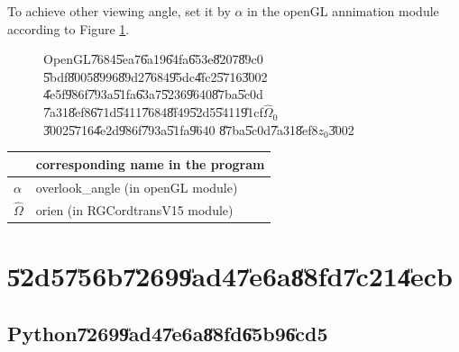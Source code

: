 To achieve other viewing angle, set it by $\alpha $ in the openGL annimation
module according to Figure \ref{gl_alpha}.

\begin{figure}[th]
\caption{OpenGL\U{7684}\U{5ea7}\U{6a19}\U{64fa}\U{653e}\U{8207}\U{89c0}%
\U{5bdf}\U{8005}\U{8996}\U{89d2}\U{7684}\U{95dc}\U{4fc2}\U{5716}\U{3002}%
\U{4e5f}\U{986f}\U{793a}\U{51fa}\U{63a7}\U{5236}\U{9640}\U{87ba}\U{5c0d}%
\U{7a31}\U{8ef8}\U{671d}\U{5411}\U{7684}\U{8f49}\U{52d5}\U{5411}\U{91cf}$%
\hat{\Omega}_{0}$\U{3002}\U{5716}\U{4e2d}\U{986f}\U{793a}\U{51fa}\U{9640}%
\U{87ba}\U{5c0d}\U{7a31}\U{8ef8}$z_{0}$\U{3002}}
\label{gl_alpha}
\begin{center}

\end{center}
\end{figure}

\begin{center}
\begin{tabular}{l|l}
& corresponding name in the program \\ \hline
$\alpha $ & overlook\_angle (in openGL module) \\ 
$\hat{\Omega}$ & orien (in RGCordtransV15 module)%
\end{tabular}
\end{center}

\section{\U{52d5}\U{756b}\U{7269}\U{9ad4}\U{7e6a}\U{88fd}\U{7c21}\U{4ecb}}

\subsection{Python\U{7269}\U{9ad4}\U{7e6a}\U{88fd}\U{65b9}\U{6cd5}}

